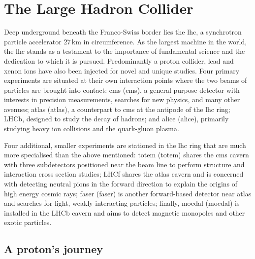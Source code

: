 

\section{The Large Hadron Collider}
\label{sec:detector_lhc}

Deep underground beneath the Franco-Swiss border lies the \acrfull{lhc}, a synchrotron particle accelerator 27\,km in circumference. As the largest machine in the world, the \acrshort{lhc} stands as a testament to the importance of fundamental science and the dedication to which it is pursued. Predominantly a proton collider, lead and xenon ions have also been injected for novel and unique studies. Four primary experiments are situated at their own interaction points where the two beams of particles are brought into contact: \acrshort{cms} (\acrlong{cms}), a general purpose detector with interests in precision measurements, searches for new physics, and many other avenues; \acrshort{atlas} (\acrlong{atlas}), a counterpart to \acrshort{cms} at the antipode of the \acrshort{lhc} ring; LHCb, designed to study the decay of \PB hadrons; and \acrshort{alice} (\acrlong{alice}), primarily studying heavy ion collisions and the quark-gluon plasma.

Four additional, smaller experiments are stationed in the \acrshort{lhc} ring that are much more specialised than the above mentioned: \acrshort{totem} (\acrlong{totem}) shares the \acrshort{cms} cavern with three subdetectors positioned near the beam line to perform \Pp structure and interaction cross section studies; LHCf shares the \acrshort{atlas} cavern and is concerned with detecting neutral pions in the forward direction to explain the origins of high energy cosmic rays; \acrshort{faser} (\acrlong{faser}) is another forward-based detector near \acrshort{atlas} and searches for light, weakly interacting particles; finally, \acrshort{moedal} (\acrlong{moedal}) is installed in the LHCb cavern and aims to detect magnetic monopoles and other exotic particles.




\subsection{A proton's journey}  %
\label{subsec:protons_journey}

